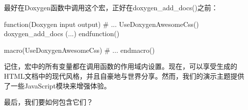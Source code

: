 最好在Doxygen函数中调用这个宏，正好在doxygen\_add\_docs()之前：


\begin{cmake}
function(Doxygen input output)
# ...
UseDoxygenAwesomeCss()
doxygen_add_docs (...)
endfunction()

macro(UseDoxygenAwesomeCss)
# ...
endmacro()
\end{cmake}

记住，宏中的所有变量都在调用函数的作用域内设置。现在，可以享受生成的HTML文档中的现代风格，并且自豪地与世界分享。然而，我们的演示主题提供了一些JavaScript模块来增强体验。

最后，我们要如何包含它们？









































































